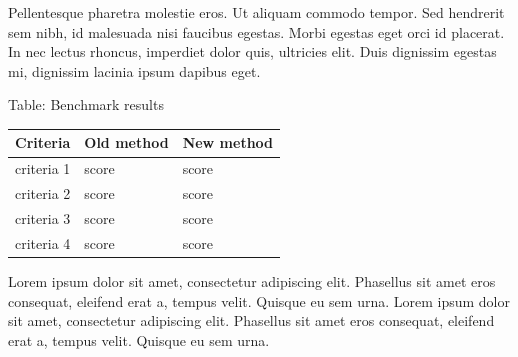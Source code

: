\documentclass[wind]{tudposter} %
\begin{document}
\begin{multicols}{2}
Pellentesque pharetra molestie eros. Ut aliquam commodo tempor. Sed hendrerit sem nibh, id malesuada nisi faucibus egestas. Morbi egestas eget orci id placerat. In nec lectus rhoncus, imperdiet dolor quis, ultricies elit. Duis dignissim egestas mi, dignissim lacinia ipsum dapibus eget.\\


\begin{minipage}[h!]{\linewidth}
	\centering
	{Table: Benchmark results}\\
	\vspace{1cm}
	\begin{tabular}{| m{8cm}  |  m{11cm}  | m{11cm}  |}\hline
		\textbf{Criteria} & \textbf{Old method} & \textbf{New method} \\\hline
		criteria 1 & score & score \\\hline
		criteria 2 & score & score \\\hline
		criteria 3 & score & score \\\hline
		criteria 4 & score & score \\\hline
	\end{tabular}
	\vspace{2cm}
\end{minipage}

Lorem ipsum dolor sit amet, consectetur adipiscing elit. Phasellus sit amet eros consequat, eleifend erat a, tempus velit. Quisque eu sem urna. Lorem ipsum dolor sit amet, consectetur adipiscing elit. Phasellus sit amet eros consequat, eleifend erat a, tempus velit. Quisque eu sem urna.\\
\end{multicols}
\end{document}
